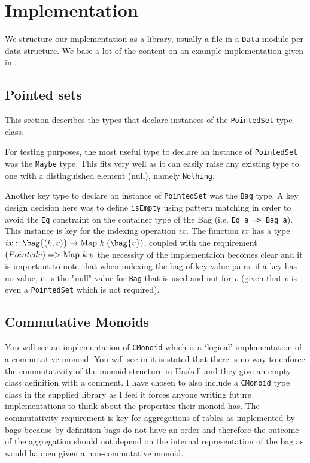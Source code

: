 \section{Implementation}
We structure our implementation as a library, usually a file in a \texttt{Data}
module per data structure. We base a lot of the content on an example
implementation given in
\cite{RelationalAlgebraByWayOfAdjunctionsPrototypeImplementation}.

\subsection{Pointed sets}
This section describes the types that declare instances of the
\texttt{PointedSet} type class.

For testing purposes, the most useful type to declare an instance of
\texttt{PointedSet} was the \texttt{Maybe} type. This fits very well as it can
easily raise any existing type to one with a distinguished element (null),
namely \texttt{Nothing}.

Another key type to declare an instance of \texttt{PointedSet} was the
\texttt{Bag} type. A key design decision here was to define \texttt{isEmpty}
using pattern matching in order to avoid the \texttt{Eq} constraint on the
container type of the Bag (i.e. \texttt{Eq a => Bag a}). This instance is key
for the indexing operation $ix$. The function $ix$ has a type $ix ::
\bag{(k, v)} \to \map{k}{(\bag{v})}$, coupled with the requirement $(Pointed v)
=> \mathrm{Map}\ k\;v$ the necessity of the implementaion becomes clear and it is
important to note that when indexing the bag of key-value pairs, if a key has no
value, it is the "null" value for \texttt{Bag} that is used and not for $v$
(given that $v$ is even a \texttt{PointedSet} which is not required).

\subsection{Commutative Monoids}
You will see an implementation of \texttt{CMonoid} which is a `logical'
implementation of a commutative monoid. You will see in
\cite{RelationalAlgebraByWayOfAdjunctions} it is stated that there is no way to
enforce the commutativity of the monoid structure in Haskell and they give an
empty class definition with a comment. I have chosen to also include a
\texttt{CMonoid} type class in the supplied library as I feel it forces anyone
writing future implementations to think about the properties their monoid has.
The commutativity requirement is key for aggregations of tables as implemented
by bags because by definition bags do not have an order and therefore the
outcome of the aggregation should not depend on the internal representation of
the bag as would happen given a non-commutative monoid. 
